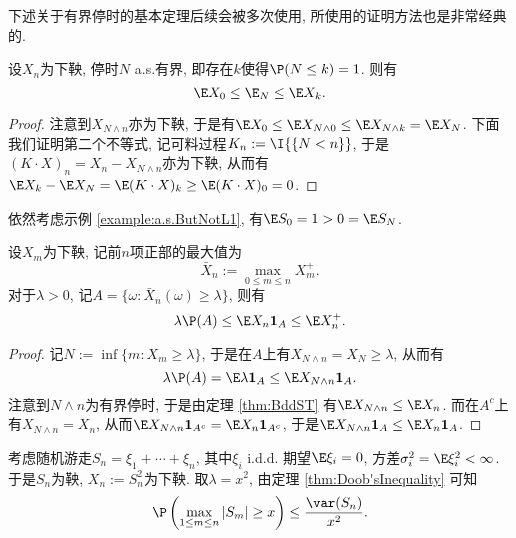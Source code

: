 \documentclass[a4paper, 10pt]{ctexart}
\begin{document}
下述关于有界停时的基本定理后续会被多次使用, 所使用的证明方法也是非常经典的. 
\begin{theorem}\label{thm:BddST}
	设$X_n$为下鞅, 停时$N$ a.s.有界, 即存在$k$使得$\P(N \leq k) = 1$. 
	则有
	\begin{equation*}
		\E X_0 \leq \E_N \leq \E X_k. 
	\end{equation*}
\end{theorem}
\begin{proof}
	注意到$X_{N \wedge n}$亦为下鞅, 于是有$\E X_0 \leq \E X_{N \wedge 0} \leq \E X_{N \wedge k} = \E X_N$. 
	下面我们证明第二个不等式, 记可料过程$K_n:= \I{\{N < n\}}$, 于是$(K \cdot X)_n = X_n - X_{N \wedge n}$亦为下鞅, 从而有$\E X_k - \E X_N = \E (K \cdot X)_k \geq \E(K \cdot X)_0 = 0$. 
\end{proof}

\begin{remark}[第一个不等号对于非有界停时未必成立!!!]
	依然考虑示例 \ref{example:a.s.ButNotL1}, 有$\E S_0 = 1 > 0 = \E S_N$. 
\end{remark}

\begin{theorem}[Doob不等式]\label{thm:Doob'sInequality}
	设$X_m$为下鞅, 记前$n$项正部的最大值为
	\begin{equation*}
		\bar X_n := \max_{0 \leq m \leq n} X_m^+. 
	\end{equation*}
	对于$\lambda > 0$, 记$A = \{\omega \colon \bar X_n(\omega) \geq \lambda\}$, 则有
	\begin{equation}
		\lambda \P(A) \leq \E X_n \mathbf 1_A \leq \E X_n^+. 
	\end{equation}
\end{theorem}
\begin{proof}
	记$N := \inf\{m \colon X_m \geq \lambda\}$, 于是在$A$上有$X_{N \wedge n} = X_N \geq \lambda$, 从而有
	\begin{equation*}
		\lambda \P(A) 
		= \E \lambda \mathbf 1_A 
		\leq \E X_{N \wedge n} \mathbf 1_A. 
	\end{equation*}
	注意到$N \wedge n$为有界停时, 于是由定理 \ref{thm:BddST} 有$\E X_{N \wedge n} \leq \E X_n$.
	 而在$A^c$上有$X_{N \wedge n} = X_n$, 从而$\E X_{N \wedge n} \mathbf 1_{A^c} = \E X_{n} \mathbf 1_{A^c}$, 于是$\E X_{N \wedge n} \mathbf 1_A \leq \E X_n \mathbf 1_A$. 
\end{proof}

\begin{example}[Kolmogorov最大值不等式]
	考虑随机游走$S_n = \xi_1 + \cdots + \xi_n$, 其中$\xi_i$ i.d.d. 期望$\E \xi_i = 0$, 方差$\sigma_i^2 = \E \xi_i^2 < \infty$. 
	于是$S_n$为鞅, $X_n:=S_n^2$为下鞅. 
	取$\lambda = x^2$, 由定理 \ref{thm:Doob'sInequality} 可知
	\begin{equation*}
		\P\left( \max_{1 \leq m \leq n} |S_m| \geq x \right) \leq \frac{\var(S_n)}{x^2}. 
	\end{equation*}
\end{example}
\end{document}
